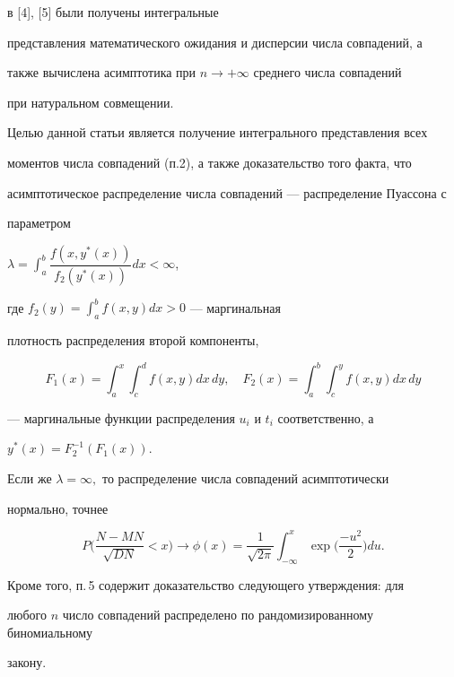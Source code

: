 в [4], [5] были получены интегральные


представления математического ожидания и дисперсии числа совпадений, а


также вычислена асимптотика при $n \to +\infty$ среднего числа совпадений


при натуральном совмещении.





Целью данной статьи является получение интегрального представления всех


моментов числа совпадений (п.2), а также доказательство того факта, что


асимптотическое распределение числа совпадений --- распределение Пуассона с


параметром


$\lambda={\displaystyle\int_{a}^{b}}\dfrac{f(x,y^\ast (x))}


{f_2(y^\ast (x))}dx<\infty$,


где $f_2(y)=\displaystyle\int_a^b{f(x,y)}dx>0$ --- маргинальная


плотность распределения второй компоненты,


$$


F_1(x)=\int_a^x\int_c^df(x,y)dx\,dy,\quad


F_2(x)=\int_a^b\int_c^yf(x,y)dx\,dy


$$


--- маргинальные функции распределения $u_i$ и $t_i$ соответственно, а


$y^*(x)=F_2^{-1}(F_{1}(x))$.





Если же $\lambda=\infty,$ то распределение числа совпадений асимптотически


нормально, точнее


$$


P\bigg(\frac{N-MN}{\sqrt{DN}} <x\bigg) \rightarrow \phi(x)=


\frac{1}{\sqrt{2\pi}}


\int_{-\infty}^x \exp \bigg(\frac{-u^2}{2}\bigg)du.


$$





Кроме того, п.\,5 содержит доказательство следующего утверждения: для


любого $n$ число совпадений распределено по рандомизированному биномиальному


закону.





